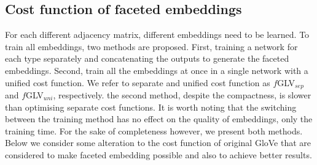 \subsection{Cost function of faceted embeddings}
\label{sec:faceted_embeddings}
For each different adjacency matrix, different embeddings need to be learned. To train all embeddings, two methods are proposed. First, training a network for each type separately and concatenating the outputs to generate the faceted embeddings. Second, train all the embeddings at once in a single network with a unified cost function. We refer to separate and unified cost function as $f$GLV$_{sep}$ and $f$GLV$_{uni}$, respectively.  the second method, despite the compactness, is slower than optimising separate cost functions. It is worth noting that the switching between the training method has no effect on the quality of embeddings, only the training time. For the sake of completeness however, we present both methods. Below we consider some alteration to the cost function of original GloVe that are considered to make faceted embedding possible and also to achieve better results. 
